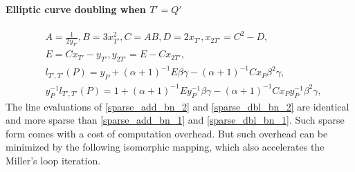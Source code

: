 \paragraph*{Elliptic curve doubling when $T'=Q'$}
\begin{subequations}
	\begin{eqnarray}
	&A=\frac{1}{2y_{T'}}, B=3x_{T'}^2, C=AB, D=2x_{T'}, x_{2T'}=C^2-D,\nonumber\\
	& E= Cx_{T'}-y_{T'}, y_{2T'}=E-Cx_{2T'},\nonumber\\
	&l_{T',T'}(P)= y_P+(\alpha+1)^{-1}E\beta\gamma-(\alpha+1)^{-1}Cx_P\beta^2 \gamma, \label{sparse_dbl_bn_1} \\
	&y_{P}^{-1}l_{T',T'}(P)= 1+(\alpha+1)^{-1}Ey_{P}^{-1}\beta\gamma-(\alpha+1)^{-1}Cx_Py_{P}^{-1}\beta^2 \gamma, \label{sparse_dbl_bn_2}
	\end{eqnarray}
\end{subequations}
The line evaluations of \eqref{sparse_add_bn_2} and \eqref{sparse_dbl_bn_2} are identical and more sparse than \eqref{sparse_add_bn_1} and \eqref{sparse_dbl_bn_1}. Such sparse form comes with a cost of computation overhead. But such overhead can be minimized by the following isomorphic mapping, which also accelerates the Miller's loop iteration.
